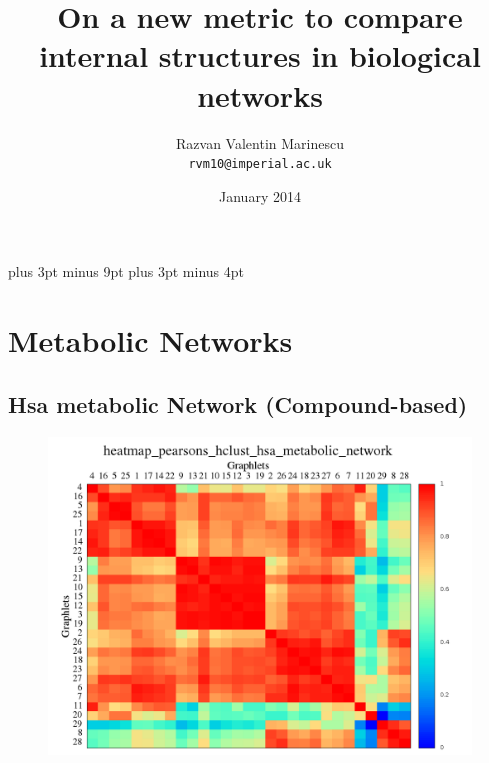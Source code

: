 \documentclass[11pt,a4paper,oneside]{report}
\title{On a new metric to compare internal structures in biological networks}
\date{January 2014}
\author{
  Razvan Valentin Marinescu\\
  \texttt{rvm10@imperial.ac.uk}
}
\begin{document}
\belowdisplayskip=12pt plus 3pt minus 9pt
\belowdisplayshortskip=7pt plus 3pt minus 4pt







\section*{Metabolic Networks}

\subsection*{Hsa metabolic Network (Compound-based)}


\begin{figure}[H]
  \centering
\includegraphics[scale=0.4]
{../code/final_results/hsa_metabolic_network/heatmap_pearsons_hclust_hsa_metabolic_network.png}
\caption{}
\label{fig:hsa_meta}
\end{figure}
\end{document}
